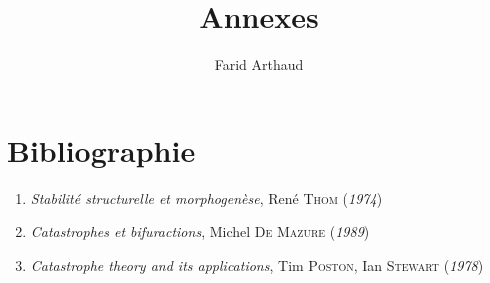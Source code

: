 \documentclass[a4paper]{article}
\theoremstyle{definition}
\begin{document}
\title{Annexes}
\author{Farid Arthaud}
\maketitle
\tableofcontents

\section{Bibliographie}
\begin{enumerate}
	\item \textit{Stabilité structurelle et morphogenèse}, René \textsc{Thom} (\textit{1974})
	\item \textit{Catastrophes et bifuractions}, Michel \textsc{De Mazure} (\textit{1989})
	\item \textit{Catastrophe theory and its applications}, Tim \textsc{Poston}, Ian \textsc{Stewart} (\textit{1978})
\end{enumerate}
\end{document}
